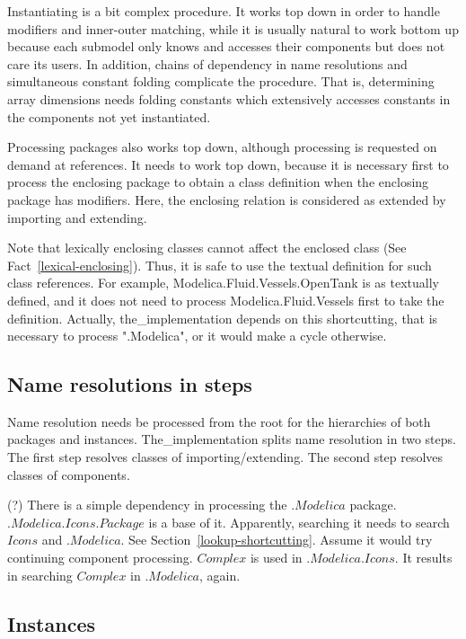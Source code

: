 \documentclass[10pt,b5paper]{article}
\begin{document}
{Instantiating} is a bit complex procedure.  It works top down in
order to handle modifiers and inner-outer matching, while it is
usually natural to work bottom up because each submodel only knows and
accesses their components but does not care its users.  In addition,
chains of dependency in name resolutions and simultaneous constant
folding complicate the procedure.  That is, determining array
dimensions needs folding constants which extensively accesses
constants in the components not yet instantiated.

Processing packages also works top down, although processing is
requested on demand at references.  It needs to work top down, because
it is necessary first to process the enclosing package to obtain a
class definition when the enclosing package has modifiers.  Here, the
enclosing relation is considered as extended by importing and
extending.

Note that lexically enclosing classes cannot affect the enclosed class
(See Fact~\ref{lexical-enclosing}).  Thus, it is safe to use the
textual definition for such class references.  For example,
Modelica.Fluid.Vessels.OpenTank is as textually defined, and it does
not need to process Modelica.Fluid.Vessels first to take the
definition.  Actually, the_implementation depends on this
shortcutting, that is necessary to process ".Modelica", or it would
make a cycle otherwise.

\subsection{Name resolutions in steps}

Name resolution needs be processed from the root for the hierarchies
of both packages and instances.  The_implementation splits name
resolution in two steps.  The first step resolves classes of
importing/extending.  The second step resolves classes of components.

(?) There is a simple dependency in processing the
$\mathit{.Modelica}$ package.  $\mathit{.Modelica.Icons.Package}$ is a
base of it.  Apparently, searching it needs to search $\mathit{Icons}$
and $\mathit{.Modelica}$.  See Section~\ref{lookup-shortcutting}.
Assume it would try continuing component processing.
$\mathit{Complex}$ is used in $\mathit{.Modelica.Icons}$.  It results
in searching $\mathit{Complex}$ in $\mathit{.Modelica}$, again.


\subsection{Instances}
\end{document}
